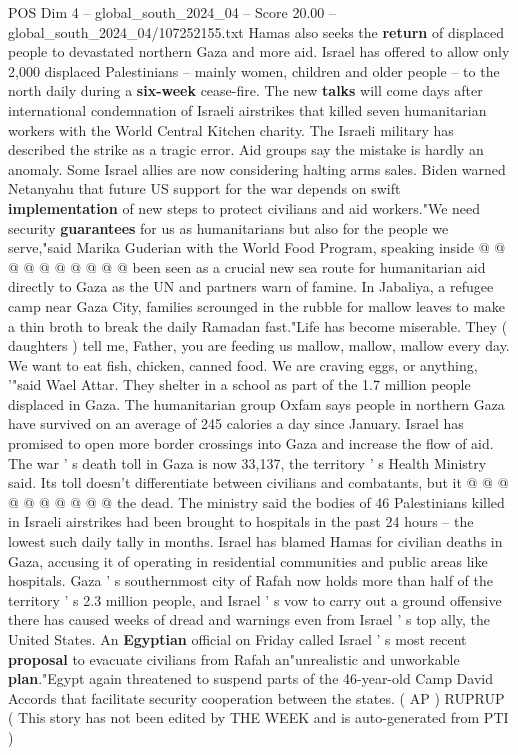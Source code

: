 \begin{textsample}{POS Dim 4 – global\_south\_2024\_04 – Score 20.00 – global\_south\_2024\_04/107252155.txt}
Hamas also seeks the \textbf{return} of displaced people to devastated northern Gaza and more aid.
Israel has offered to allow only 2,000 displaced Palestinians -- mainly women, children and older people -- to the north daily during a \textbf{six-week} cease-fire.
The new \textbf{talks} will come days after international condemnation of Israeli airstrikes that killed seven humanitarian workers with the World Central Kitchen charity.
The Israeli military has described the strike as a tragic error.
Aid groups say the mistake is hardly an anomaly.
Some Israel allies are now considering halting arms sales.
Biden warned Netanyahu that future US support for the war depends on swift \textbf{implementation} of new steps to protect civilians and aid workers."We need security \textbf{guarantees} for us as humanitarians but also for the people we serve,"said Marika Guderian with the World Food Program, speaking inside @ @ @ @ @ @ @ @ @ @ been seen as a crucial new sea route for humanitarian aid directly to Gaza as the UN and partners warn of famine.
In Jabaliya, a refugee camp near Gaza City, families scrounged in the rubble for mallow leaves to make a thin broth to break the daily Ramadan fast."Life has become miserable.
They ( daughters ) tell me, Father, you are feeding us mallow, mallow, mallow every day.
We want to eat fish, chicken, canned food.
We are craving eggs, or anything, '"said Wael Attar.
They shelter in a school as part of the 1.7 million people displaced in Gaza.
The humanitarian group Oxfam says people in northern Gaza have survived on an average of 245 calories a day since January.
Israel has promised to open more border crossings into Gaza and increase the flow of aid.
The war ' s death toll in Gaza is now 33,137, the territory ' s Health Ministry said.
Its toll doesn't differentiate between civilians and combatants, but it @ @ @ @ @ @ @ @ @ @ the dead.
The ministry said the bodies of 46 Palestinians killed in Israeli airstrikes had been brought to hospitals in the past 24 hours -- the lowest such daily tally in months.
Israel has blamed Hamas for civilian deaths in Gaza, accusing it of operating in residential communities and public areas like hospitals.
Gaza ' s southernmost city of Rafah now holds more than half of the territory ' s 2.3 million people, and Israel ' s vow to carry out a ground offensive there has caused weeks of dread and warnings even from Israel ' s top ally, the United States.
An \textbf{Egyptian} official on Friday called Israel ' s most recent \textbf{proposal} to evacuate civilians from Rafah an"unrealistic and unworkable \textbf{plan}."Egypt again threatened to suspend parts of the 46-year-old Camp David Accords that facilitate security cooperation between the states. ( AP ) RUPRUP ( This story has not been edited by THE WEEK and is auto-generated from PTI )

\end{textsample}

